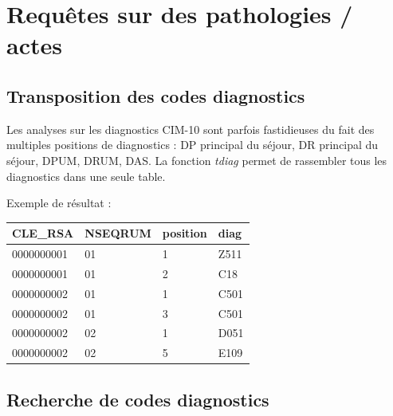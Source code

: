\documentclass[]{book}
\newenvironment{Shaded}{\begin{snugshade}}{\end{snugshade}}
\newcommand{\CommentTok}[1]{\textcolor[rgb]{0.56,0.35,0.01}{\textit{#1}}}
\newcommand{\KeywordTok}[1]{\textcolor[rgb]{0.13,0.29,0.53}{\textbf{#1}}}
\newcommand{\NormalTok}[1]{#1}
\newcommand{\OperatorTok}[1]{\textcolor[rgb]{0.81,0.36,0.00}{\textbf{#1}}}
\newcommand{\StringTok}[1]{\textcolor[rgb]{0.31,0.60,0.02}{#1}}
\begin{document}
\hypertarget{requetes-sur-des-pathologies-actes}{%
\chapter{Requêtes sur des pathologies / actes}\label{requetes-sur-des-pathologies-actes}}

\hypertarget{transposition-des-codes-diagnostics}{%
\section{Transposition des codes diagnostics}\label{transposition-des-codes-diagnostics}}

Les analyses sur les diagnostics CIM-10 sont parfois fastidieuses du fait des multiples positions de diagnostics : DP principal du séjour, DR principal du séjour, DPUM, DRUM, DAS. La fonction \emph{tdiag} permet de rassembler tous les diagnostics dans une seule table.

\begin{Shaded}
\end{Shaded}

Exemple de résultat :

\begin{longtable}[]{@{}llll@{}}
\toprule
CLE\_RSA & NSEQRUM & position & diag\tabularnewline
\midrule
\endhead
0000000001 & 01 & 1 & Z511\tabularnewline
0000000001 & 01 & 2 & C18\tabularnewline
0000000002 & 01 & 1 & C501\tabularnewline
0000000002 & 01 & 3 & C501\tabularnewline
0000000002 & 02 & 1 & D051\tabularnewline
0000000002 & 02 & 5 & E109\tabularnewline
\bottomrule
\end{longtable}

\hypertarget{recherche-de-codes-diagnostics}{%
\section{Recherche de codes diagnostics}\label{recherche-de-codes-diagnostics}}
\end{document}
